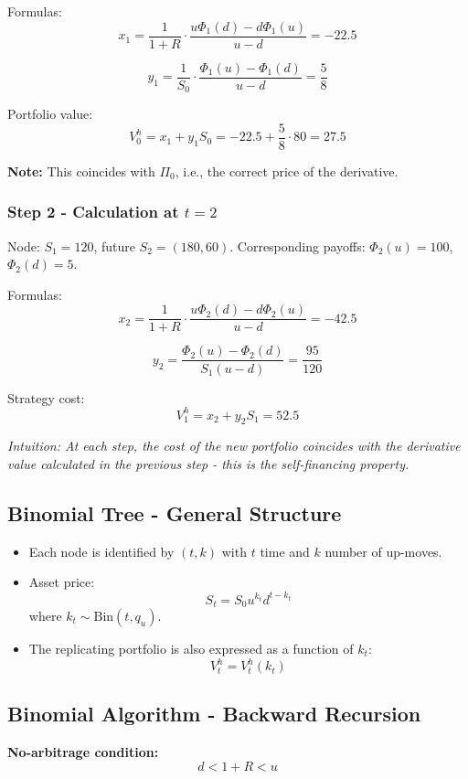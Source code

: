\documentclass[12pt,a4paper]{article}
\theoremstyle{definition}
\begin{document}
Formulas:
\[
x_1 = \frac{1}{1+R} \cdot \frac{u\Phi_1(d) - d\Phi_1(u)}{u-d} = -22.5
\]

\[
y_1 = \frac{1}{S_0} \cdot \frac{\Phi_1(u) - \Phi_1(d)}{u-d} = \frac{5}{8}
\]

Portfolio value:
\[
V_0^h = x_1 + y_1 S_0 = -22.5 + \frac{5}{8} \cdot 80 = 27.5
\]

\textbf{Note:} This coincides with $\Pi_0$, i.e., the correct price of the derivative.

\subsubsection{Step 2 - Calculation at $t=2$}

Node: $S_1 = 120$, future $S_2 = (180, 60)$.
Corresponding payoffs: $\Phi_2(u) = 100$, $\Phi_2(d) = 5$.

Formulas:
\[
x_2 = \frac{1}{1+R} \cdot \frac{u\Phi_2(d) - d\Phi_2(u)}{u-d} = -42.5
\]

\[
y_2 = \frac{\Phi_2(u) - \Phi_2(d)}{S_1(u-d)} = \frac{95}{120}
\]

Strategy cost:
\[
V_1^h = x_2 + y_2 S_1 = 52.5
\]

\textit{Intuition: At each step, the cost of the new portfolio coincides with the derivative value calculated in the previous step - this is the self-financing property.}

\subsection{Binomial Tree - General Structure}

\begin{itemize}
\item Each node is identified by $(t, k)$ with $t$ time and $k$ number of up-moves.
\item Asset price:
\[
S_t = S_0 u^{k_t} d^{t-k_t}
\]
where $k_t \sim \text{Bin}(t, q_u)$.
\item The replicating portfolio is also expressed as a function of $k_t$:
\[
V_t^h = V_t^h(k_t)
\]
\end{itemize}

\subsection{Binomial Algorithm - Backward Recursion}

\textbf{No-arbitrage condition:}
\[
d < 1+R < u
\]

\begin{center}
\end{center}
\end{document}
